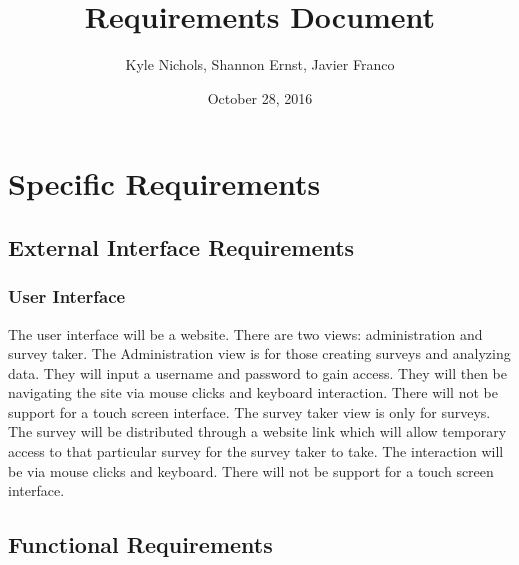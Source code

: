\documentclass[letterpaper,10pt,titlepage, draftclsnofoot,onecolumn]{IEEEtran}
\begin{document}
\title{Requirements Document}
\author{Kyle Nichols, Shannon Ernst, Javier Franco}
\date{October 28, 2016}
\maketitle

\section{Specific Requirements}
\subsection{External Interface Requirements}
\subsubsection{User Interface}
The user interface will be a website. There are two views: administration and survey taker. 
The Administration view is for those creating surveys and analyzing data. They will input a 
username and password to gain access. They will then be navigating the site via mouse clicks 
and keyboard interaction. There will not be support for a touch screen interface. The survey
taker view is only for surveys. The survey will be distributed through a website link which 
will allow temporary access to that particular survey for the survey taker to take. The 
interaction will be via mouse clicks and keyboard. There will not be support for a touch screen
interface.

\subsection{Functional Requirements}
\end{document}
